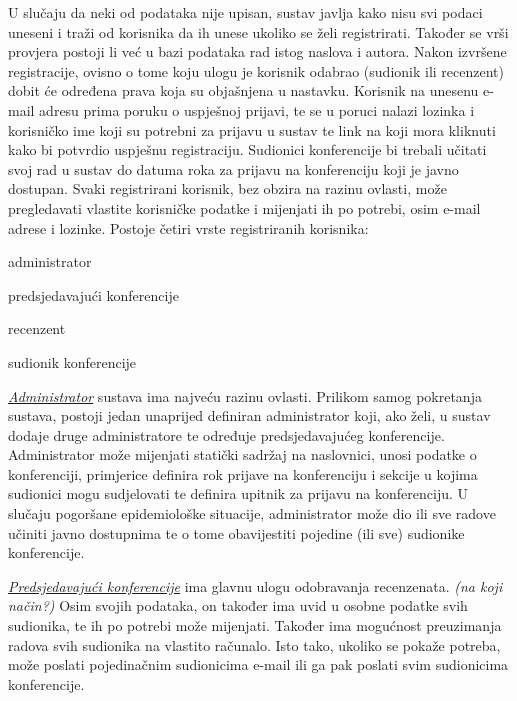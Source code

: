 		U slučaju da neki od podataka nije upisan, sustav javlja kako nisu svi podaci uneseni i traži od korisnika da ih unese ukoliko se želi registrirati. Također se vrši provjera postoji li već u bazi podataka rad istog naslova i autora. Nakon izvršene registracije, ovisno o tome koju ulogu je korisnik odabrao (sudionik ili recenzent) dobit će određena prava koja su objašnjena u nastavku. Korisnik na unesenu e-mail adresu prima poruku o uspješnoj prijavi, te se u poruci nalazi lozinka i korisničko ime koji su potrebni za prijavu u sustav te link na koji mora kliknuti kako bi potvrdio uspješnu registraciju. Sudionici konferencije bi trebali učitati svoj rad u sustav do datuma roka za prijavu na konferenciju koji je javno dostupan.
		\newline
		\newline
		Svaki registrirani korisnik, bez obzira na razinu ovlasti, može pregledavati vlastite korisničke podatke i mijenjati ih po potrebi, osim e-mail adrese i lozinke. 
		\newline
		\newline
		Postoje četiri vrste registriranih korisnika:
		
		\begin{packed_item}
			
			\item administrator
			\item predsjedavajući konferencije
			\item recenzent
			\item sudionik konferencije
			
		\end{packed_item}
	
		\underline{\textit{Administrator}} sustava ima najveću razinu ovlasti. Prilikom samog pokretanja sustava, postoji jedan unaprijed definiran administrator koji, ako želi, u sustav dodaje druge administratore te određuje predsjedavajućeg konferencije. Administrator može mijenjati statički sadržaj na naslovnici, unosi podatke o konferenciji, primjerice definira rok prijave na konferenciju i sekcije u kojima sudionici mogu sudjelovati te definira upitnik za prijavu na konferenciju. U slučaju pogoršane epidemiološke situacije, administrator može dio ili sve radove učiniti javno dostupnima te o tome obavijestiti pojedine (ili sve) sudionike konferencije.
		
		
		\underline{\textit{Predsjedavajući konferencije}} ima glavnu ulogu odobravanja recenzenata. \textit{(na koji način?)} Osim svojih podataka, on također ima uvid u osobne podatke svih sudionika, te ih po potrebi može mijenjati. Također ima mogućnost preuzimanja radova svih sudionika na vlastito računalo. Isto tako, ukoliko se pokaže potreba, može poslati pojedinačnim sudionicima e-mail ili ga pak poslati svim sudionicima konferencije. 
		
